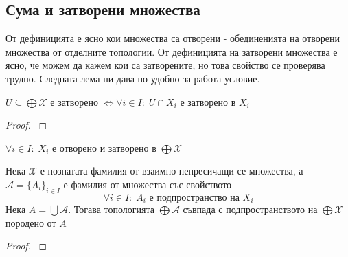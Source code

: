 \subsection{Сума и затворени множества}
От дефиницията е ясно кои множества са отворени - обединенията на отворени множества от отделните топологии. От дефиницията на затворени множества е ясно, че можем да кажем кои са затворените, но това свойство се проверява трудно. Следната лема ни дава по-удобно за работа условие.
\begin{lemma}
    $U \subseteq \bigoplus \mathcal X$ е затворено $\iff \forall i \in I:\; U \cap X_i$ е затворено в $X_i$
\end{lemma}
\begin{proof}
    \cite[p.~74]{engelking1989general}
\end{proof}

\begin{corollary}
    $\forall i \in I:\; X_i$ е отворено и затворено в $\bigoplus \mathcal X$
\end{corollary}
\begin{proposition}
    Нека $\mathcal X$ е познатата фамилия от взаимно непресичащи се множества, а $\mathcal A = \{A_i\}_{i \in I}$ е фамилия от множества със свойството
    \begin{equation*}
        \forall i\in I:\; A_i \text{ е подпространство на } X_i
    \end{equation*}
    Нека $A = \bigcup \mathcal A$. Тогава топологията $\bigoplus \mathcal A$ съвпада с подпространството на $\bigoplus \mathcal X$ породено от $A$
\end{proposition}
\begin{proof}
    \cite[p.~75]{engelking1989general}
\end{proof}
